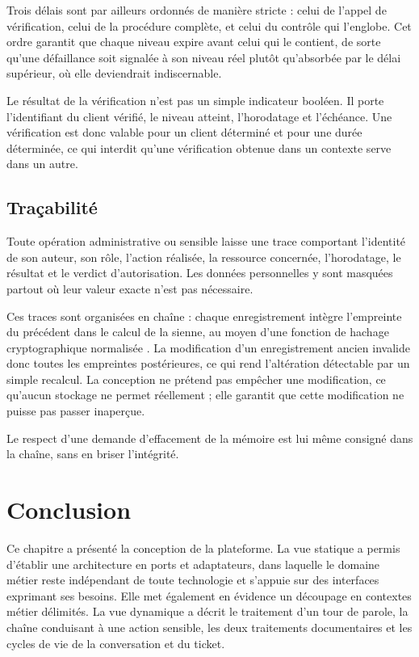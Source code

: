 Trois délais sont par ailleurs ordonnés de manière stricte : celui de l'appel de vérification, celui de la procédure complète, et celui du contrôle qui l'englobe. Cet ordre garantit que chaque niveau expire avant celui qui le contient, de sorte qu'une défaillance soit signalée à son niveau réel plutôt qu'absorbée par le délai supérieur, où elle deviendrait indiscernable.

Le résultat de la vérification n'est pas un simple indicateur booléen. Il porte l'identifiant du client vérifié, le niveau atteint, l'horodatage et l'échéance. Une vérification est donc valable pour un client déterminé et pour une durée déterminée, ce qui interdit qu'une vérification obtenue dans un contexte serve dans un autre.

\subsection{Traçabilité}

Toute opération administrative ou sensible laisse une trace comportant l'identité de son auteur, son rôle, l'action réalisée, la ressource concernée, l'horodatage, le résultat et le verdict d'autorisation. Les données personnelles y sont masquées partout où leur valeur exacte n'est pas nécessaire.

Ces traces sont organisées en chaîne : chaque enregistrement intègre l'empreinte du précédent dans le calcul de la sienne, au moyen d'une fonction de hachage cryptographique normalisée \cite{sha}. La modification d'un enregistrement ancien invalide donc toutes les empreintes postérieures, ce qui rend l'altération détectable par un simple recalcul. La conception ne prétend pas empêcher une modification, ce qu'aucun stockage ne permet réellement ; elle garantit que cette modification ne puisse pas passer inaperçue.

Le respect d'une demande d'effacement de la mémoire est lui même consigné dans la chaîne, sans en briser l'intégrité.

\section*{Conclusion}

Ce chapitre a présenté la conception de la plateforme. La vue statique a permis d'établir une architecture en ports et adaptateurs, dans laquelle le domaine métier reste indépendant de toute technologie et s'appuie sur des interfaces exprimant ses besoins. Elle met également en évidence un découpage en contextes métier délimités. La vue dynamique a décrit le traitement d'un tour de parole, la chaîne conduisant à une action sensible, les deux traitements documentaires et les cycles de vie de la conversation et du ticket.

